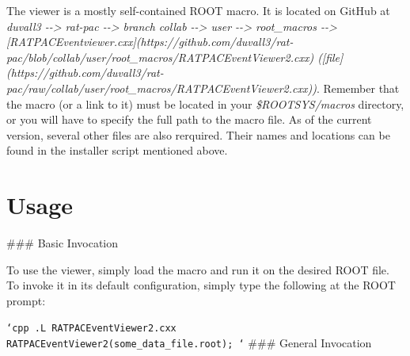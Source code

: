 \documentclass[a4paper]{article}
\providecommand*{\DUroletitlereference}[1]{\textsl{#1}}
\begin{document}
The viewer is a mostly self-contained ROOT macro. It is located on GitHub at \emph{duvall3 -{}-> rat-pac -{}-> branch collab -{}-> user -{}-> root\_macros -{}-> {[}RATPACEventviewer.cxx{]}(https://github.com/duvall3/rat-pac/blob/collab/user/root\_macros/RATPACEventViewer2.cxx) ({[}file{]}(https://github.com/duvall3/rat-pac/raw/collab/user/root\_macros/RATPACEventViewer2.cxx))}.
Remember that the macro (or a link to it) must be located in your \DUroletitlereference{\$ROOTSYS/macros} directory, or you will have to specify the full path to the macro file.
As of the current version, several other files are also rerquired. Their names and locations can be found in the installer script mentioned above.


\section{Usage%
  \label{usage}%
}

\#\#\# Basic Invocation

To use the viewer, simply load the macro and run it on the desired ROOT file.  To invoke it in its default configuration, simply type the following at the ROOT prompt:

\texttt{`cpp
.L RATPACEventViewer2.cxx
RATPACEventViewer2(\textquotedbl{}some\_data\_file.root\textquotedbl{});
`}
\#\#\# General Invocation
\end{document}
